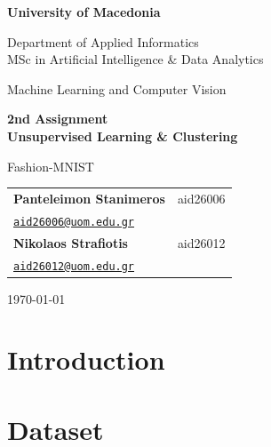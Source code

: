 \documentclass[11pt,a4paper]{article}
\begin{document}
\begin{titlepage}
  \centering
  \vspace*{1.5cm}

  {\Large\bfseries University of Macedonia\par}
  \vspace{0.4cm}
  {\large Department of Applied Informatics\\
   MSc in Artificial Intelligence \& Data Analytics\par}

  \vfill

  {\large Machine Learning and Computer Vision\par}
  \vspace{0.5cm}
  {\LARGE\bfseries 2nd Assignment\\[6pt] Unsupervised Learning \& Clustering\par}
  \vspace{0.4cm}
  {\large Fashion-MNIST\par}

  \vfill

  \begin{tabular}{ll}
    \textbf{Panteleimon Stanimeros} & aid26006 \\
    \href{mailto:aid26006@uom.edu.gr}{\texttt{aid26006@uom.edu.gr}} & \\[8pt]
    \textbf{Nikolaos Strafiotis}    & aid26012 \\
    \href{mailto:aid26012@uom.edu.gr}{\texttt{aid26012@uom.edu.gr}} & \\
  \end{tabular}

  \vfill
  {\large\today\par}
\end{titlepage}

\tableofcontents
\clearpage

\section{Introduction}


\section{Dataset}


\end{document}
